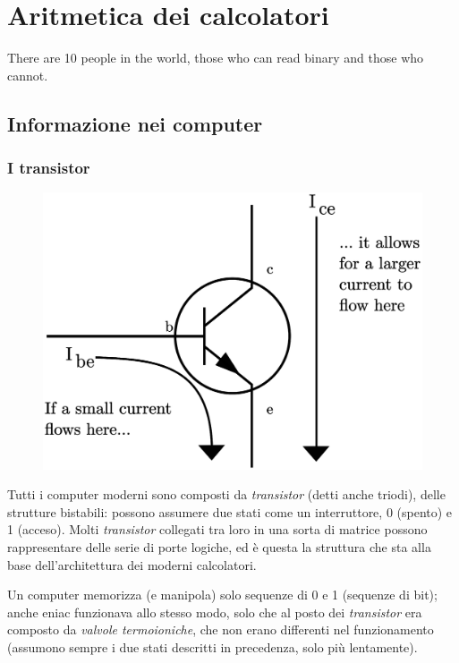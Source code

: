 \documentclass[class=book, crop=false, oneside]{standalone}
\begin{document}
\chapter{Aritmetica dei calcolatori}\begin{fquote}[Anonymous]There are 10 people in the world, those who can read binary and those who cannot.
 \end{fquote}

\section{Informazione nei computer}

\subsection{I transistor}

\begin{figure}
	\includegraphics[width=\linewidth]{transistor.eps}
	\label{fig:transistor}
	\centering
\end{figure}

Tutti i computer moderni sono composti da \emph{transistor} (detti anche triodi), delle strutture bistabili: possono assumere due stati come un interruttore, 0 (spento) e 1 (acceso). Molti \emph{transistor} collegati tra loro in una sorta di matrice possono rappresentare delle serie di porte logiche, ed è questa la struttura che sta alla base dell'architettura dei moderni calcolatori.

Un computer memorizza (e manipola) solo sequenze di 0 e 1 (sequenze di bit); anche \acrshort{eniac} funzionava allo stesso modo, solo che al posto dei \emph{transistor} era composto da \emph{valvole termoioniche}, che non erano differenti nel funzionamento (assumono sempre i due stati descritti in precedenza, solo più lentamente).
\end{document}
